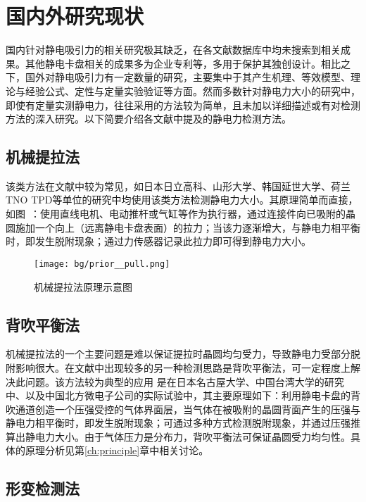 \section{国内外研究现状}\label{sec:bg-prior}

国内针对静电吸引力的相关研究极其缺乏，在各文献数据库中均未搜索到相关成果。其他静电卡盘相关的成果多为企业专利等，多用于保护其独创设计。相比之下，国外对静电吸引力有一定数量的研究，主要集中于其产生机理、等效模型、理论与经验公式、定性与定量实验验证等方面。然而多数针对静电力大小的研究中，即使有定量实测静电力，往往采用的方法较为简单，且未加以详细描述或有对检测方法的深入研究。以下简要介绍各文献中提及的静电力检测方法。


\subsection{机械提拉法}\label{sec:bg-prior--pull}

该类方法在文献中较为常见，如日本日立高科\cite{RefWorks:50}、山形大学\cite{RefWorks:44}、韩国延世大学\cite{RefWorks:63}、荷兰TNO TPD\cite{RefWorks:51}等单位的研究中均使用该类方法检测静电力大小。其原理简单而直接，如图~：使用直线电机、电动推杆或气缸等作为执行器，通过连接件向已吸附的晶圆施加一个向上（远离静电卡盘表面）的拉力；当该力逐渐增大，与静电力相平衡时，即发生脱附现象；通过力传感器记录此拉力即可得到静电力大小。

\begin{figure}[tbh]
\centering
\texttt{[image: bg/prior\_\_pull.png]}
\caption{机械提拉法原理示意图}
\label{fig:bg-prior-pull}
\end{figure}


\subsection{背吹平衡法}\label{sec:bg-prior-pressure}

机械提拉法的一个主要问题是难以保证提拉时晶圆均匀受力，导致静电力受部分脱附影响很大。在文献中出现较多的另一种检测思路是背吹平衡法，可一定程度上解决此问题。该方法较为典型的应用 是在日本名古屋大学\cite{RefWorks:43}、中国台湾大学\cite{RefWorks:53}的研究中、以及中国北方微电子公司的实际试验中，其主要原理如下：利用静电卡盘的背吹通道创造一个压强受控的气体界面层，当气体在被吸附的晶圆背面产生的压强与静电力相平衡时，即发生脱附现象；可通过多种方式检测脱附现象，并通过压强推算出静电力大小。由于气体压力是分布力，背吹平衡法可保证晶圆受力均匀性。具体的原理分析见第\ref{ch:principle}章中相关讨论。


\subsection{形变检测法}\label{sec:bg-prior-warp}

